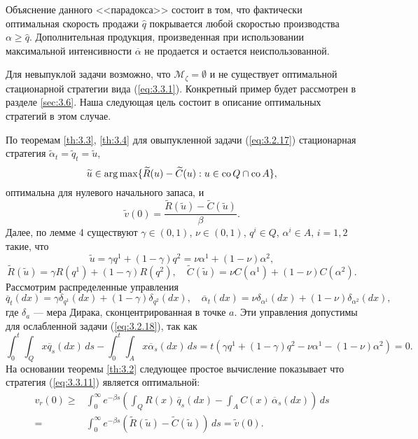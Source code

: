 Объяснение данного <<парадокса>> состоит в том, что фактически оптимальная скорость продажи $\widehat q$ покрывается  любой скоростью производства $\alpha\ge\widehat q$. Дополнительная продукция, произведенная при использовании максимальной интенсивности $\overline\alpha$ не продается и остается неиспользованной.

Для невыпуклой задачи возможно, что $\mathscr M_\zeta=\emptyset$ и не существует оптимальной стационарной стратегии вида (\ref{eq:3.3.1}).
Конкретный пример будет рассмотрен в разделе \ref{sec:3.6}. Наша следующая цель состоит в описание оптимальных стратегий в этом случае.

По теоремам \ref{th:3.3}, \ref{th:3.4} для овыпукленной задачи (\ref{eq:3.2.17}) стационарная стратегия $\widetilde\alpha_t=\widetilde q_t=\widetilde u$,
\begin{equation} \label{eq:3.3.8}
\widetilde u\in\arg\max\{\widetilde R(u)-\widetilde C(u):u\in{\rm co\,} Q\cap{\rm co\,} A\},
\end{equation}
оптимальна для нулевого начального запаса, и
$$\widetilde v(0)=\frac{\widetilde R(\widetilde u)-\widetilde C(\widetilde u)}{\beta}.$$
Далее, по лемме 4 существуют $\gamma\in (0,1)$, $\nu\in (0,1)$, $q^i\in Q$, $\alpha^i\in A$, $i=1,2$ такие, что
\begin{equation} \label{eq:3.3.9}
\widetilde u=\gamma q^1+(1-\gamma) q^2=\nu\alpha^1+(1-\nu)\alpha^2,
\end{equation}
\begin{equation} \label{eq:3.3.10}
\widetilde R(\widetilde u)=\gamma R(q^1)+(1-\gamma) R(q^2),\quad \widetilde C(\widetilde u)=\nu C(\alpha^1)+(1-\nu) C(\alpha^2).
\end{equation}
Рассмотрим распределенные управления
\begin{equation} \label{eq:3.3.11}
 \overline q_t(dx)=\gamma\delta_{q^1}(dx)+(1-\gamma)\delta_{q^2}(dx),\quad
 \overline \alpha_t(dx)=\nu\delta_{\alpha^1}(dx)+(1-\nu)\delta_{\alpha^2}(dx),
\end{equation}
где $\delta_a$ --- мера Дирака, сконцентрированная в точке $a$. Эти управления допустимы для ослабленной задачи (\ref{eq:3.2.18}), так как
$$ \int_0^t \int_Q x\overline q_s(dx)\,ds-\int_0^t \int_A x\overline\alpha_s(dx)\,ds=t(\gamma q^1+(1-\gamma) q^2-\nu\alpha^1-(1-\nu)\alpha^2)=0.$$
На основании теоремы \ref{th:3.2} следующее простое вычисление показывает что стратегия (\ref{eq:3.3.11}) является оптимальной:
\begin{align*}
v_r(0)\ge &\int_0^\infty e^{-\beta s}\left(\int_Q R(x)\,\overline q_s(dx)-\int_A C(x)\,\overline \alpha_s(dx)\right)\,ds\nonumber\\
=&\int_0^\infty e^{-\beta s}\left(\widetilde R(\widetilde u)-\widetilde C(\widetilde u)\right)\,ds=\widetilde v(0).
\end{align*}

